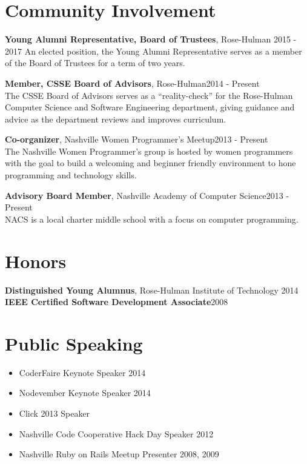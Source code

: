 \documentclass[line, margin, 10pt]{res}
\begin{document}
\begin{resume}
\section{Community Involvement}

{\bf Young Alumni Representative, Board of Trustees}, Rose-Hulman 2015 - 2017
An elected position, the Young Alumni Representative serves as a member of the Board of Trustees for a term of two years.

{\bf Member, CSSE Board of Advisors}, Rose-Hulman\hfill 2014 - Present\\
The CSSE Board of Advisors serves as a ``reality-check'' for the Rose-Hulman Computer Science and Software Engineering department, giving guidance and advice as the department reviews and improves curriculum.

{\bf Co-organizer}, Nashville Women Programmer's Meetup\hfill 2013 - Present\\
The Nashville Women Programmer's group is hosted by women programmers with the goal to build a welcoming and beginner friendly environment to hone programming and technology skills.

{\bf Advisory Board Member}, Nashville Academy of Computer Science\hfill 2013 - Present\\
NACS is a local charter middle school with a focus on computer programming.

\section{Honors}

{\bf Distinguished Young Alumnus}, Rose-Hulman Institute of Technology \hfill 2014\\
{\bf IEEE Certified Software Development Associate}\hfill 2008

\section{Public Speaking}

\begin{itemize}\itemsep -2pt
  \item CoderFaire Keynote Speaker 2014
  \item Nodevember Keynote Speaker 2014
  \item Click 2013 Speaker
  \item Nashville Code Cooperative Hack Day Speaker 2012
  \item Nashville Ruby on Rails Meetup Presenter 2008, 2009
\end{itemize}


\end{resume}
\end{document}

